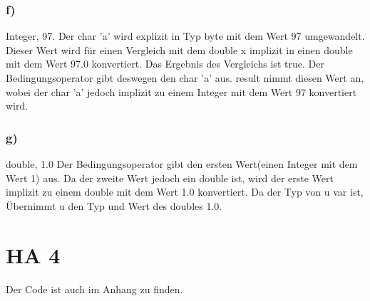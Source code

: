 \documentclass[a4paper]{article}
\begin{document}
\subsubsection*{f)}
Integer, 97. Der char 'a' wird explizit in Typ byte mit dem Wert 97 umgewandelt. Dieser Wert wird für einen Vergleich mit dem double x implizit in einen double mit dem Wert 97.0 konvertiert. Das Ergebnis des Vergleichs ist true. Der Bedingungsoperator gibt deswegen den char 'a' aus. result nimmt diesen Wert an, wobei der char 'a' jedoch implizit zu einem Integer mit dem Wert 97 konvertiert wird.
\subsubsection*{g)}
double, 1.0 Der Bedingungsoperator gibt den ersten Wert(einen Integer mit dem Wert 1) aus. Da der zweite Wert jedoch ein double ist, wird der erste Wert implizit zu einem double mit dem Wert 1.0 konvertiert. Da der Typ von u var ist, Übernimmt u den Typ und Wert des doubles 1.0. 

\section*{ HA 4 }

Der Code ist auch im Anhang zu finden.
\end{document}
